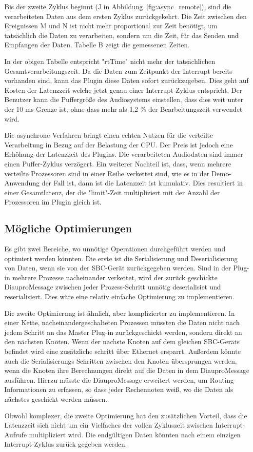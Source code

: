 Bis der zweite Zyklus beginnt (J in Abbildung~\ref{fig:async_remote}), sind die verarbeiteten Daten aus dem ersten Zyklus zurückgekehrt. Die Zeit zwischen den Ereignissen M und N ist nicht mehr proportional zur Zeit benötigt, um tatsächlich die Daten zu verarbeiten, sondern um die Zeit, für das Senden und Empfangen der Daten. Tabelle B zeigt die gemessenen Zeiten.



In der obigen Tabelle entspricht "rtTime" nicht mehr der tatsächlichen Gesamtverarbeitungszeit. Da die Daten zum Zeitpunkt der Interrupt bereits vorhanden sind, kann das Plugin diese Daten sofort zurückzugeben. Dies geht auf Kosten der Latenzzeit welche jetzt genau einer Interrupt-Zyklus entspricht. Der Benutzer kann die Puffergröße des Audiosystems einstellen, dass dies weit unter der 10 ms Grenze ist, ohne dass mehr als 1,2 \% der Bearbeitungszeit verwendet wird.

Die asynchrone Verfahren bringt einen echten Nutzen für die verteilte Verarbeitung in Bezug auf der Belastung der CPU. Der Preis ist jedoch eine Erhöhung der Latenzzeit des Plugins. Die verarbeiteten Audiodaten sind immer einen Puffer-Zyklus verzögert. Ein weiterer Nachteil ist, dass, wenn mehrere verteilte Prozessoren sind in einer Reihe verkettet sind, wie es in der Demo-Anwendung der Fall ist, dann ist die Latenzzeit ist kumulativ. Dies resultiert in einer Gesamtlatenz, der die "limit"-Zeit multipliziert mit der Anzahl der Prozessoren im Plugin gleich ist.

\subsection{Mögliche Optimierungen}

Es gibt zwei Bereiche, wo unnötige Operationen durchgeführt werden und optimiert werden könnten. Die erste ist die Serialisierung und Deserialisierung von Daten, wenn sie von der SBC-Gerät zurückgegeben werden. Sind in der Plug-in mehrere Prozesse nacheinander verkettet, wird der zurück  geschickte DiauproMessage zwischen jeder Prozess-Schritt unnötig deserialisiet und reserialisiert. Dies wäre eine relativ einfache Optimierung zu implementieren.

Die zweite Optimierung ist ähnlich, aber komplizierter zu implementieren. In einer Kette, nacheinandergeschalteten Prozessen müssten die Daten nicht nach jedem Schritt an das Master Plug-in zurückgeschickt werden, sondern direkt an den nächsten Knoten. Wenn der nächste Knoten auf dem gleichen SBC-Geräts befindet wird eine zusätzliche schritt über Ethernet ersparrt. Außerdem könnte auch die Serialisierungs Schritten zwischen den Knoten übersprungen werden, wenn die Knoten ihre Berechnungen direkt auf die Daten in dem DiauproMessage ausführen. Hierzu müsste die DiauproMessage erweitert werden, um Routing-Informationen zu erfassen, so dass jeder Rechennoten weiß, wo die Daten als nächstes geschickt werden müssen.

Obwohl komplexer, die zweite Optimierung hat den zusätzlichen Vorteil, dass die Latenzzeit sich nicht um ein Vielfaches der vollen Zykluszeit zwischen Interrupt-Aufrufe multipliziert wird. Die endgültigen Daten könnten nach einem einzigen Interrupt-Zyklus zurück gegeben werden.


